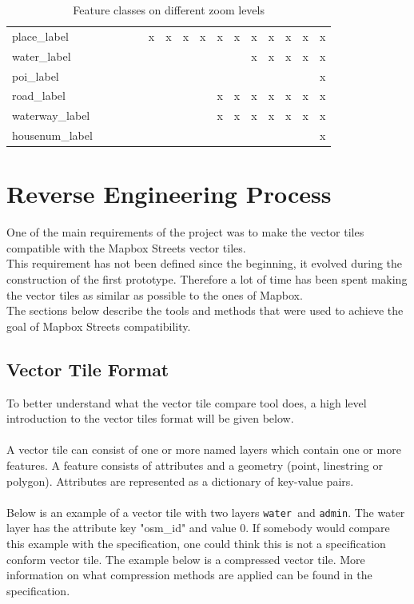 \begin{table}[H]
{\begin{tabular}{l|ccccccccccccccc}
place\_label &  &  &  &  & x & x & x & x & x & x & x & x & x & x & x \\
water\_label &  &  &  &  &  &  &  &  &  &  & x & x & x & x & x \\
poi\_label &  &  &  &  &  &  &  &  &  &  &  &  &  &  & x \\
road\_label &  &  &  &  &  &  &  &  & x & x & x & x & x & x & x \\
waterway\_label &  &  &  &  &  &  &  &  & x & x & x & x & x & x & x \\
housenum\_label &  &  &  &  &  &  &  &  &  &  &  &  &  &  & x
\end{tabular}
}
\caption{Feature classes on different zoom levels}
\label{my-label}
\end{table}

\section{Reverse Engineering Process}\label{reverse_engineering_process}
One of the main requirements of the project was to make the vector tiles compatible with the Mapbox Streets vector tiles\cite{22_mapbox.com_2015}.
\\
This requirement has not been defined since the beginning, it evolved during the construction of the first prototype.
Therefore a lot of time has been spent making the vector tiles as similar as possible to the ones of Mapbox.
\\
The sections below describe the tools and methods that were used to achieve the goal of Mapbox Streets compatibility.
\newpage

\subsection{Vector Tile Format}\label{vector_tile_format}
To better understand what the vector tile compare tool does, a high level introduction to the vector tiles format will be given below.
\\\\
A vector tile can consist of one or more named layers which contain one or more features\cite{4_github_2015}.
A feature consists of attributes and a geometry (point, linestring or polygon).
Attributes are represented as a dictionary of key-value pairs.
\\\\
Below is an example of a vector tile with two layers \texttt{water }and \texttt{admin}.
The water layer has the attribute key "osm\_id" and value 0. If somebody would compare this example with the specification\cite{4_github_2015}, one could think this is not a specification conform vector tile. The example below is a compressed vector tile. More information on what compression methods are applied can be found in the specification.\\

